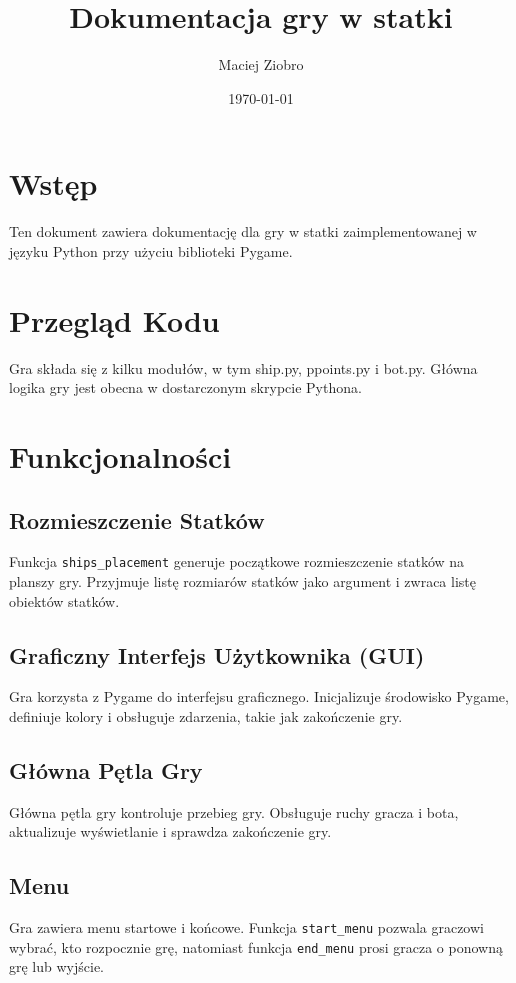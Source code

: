 \documentclass[12pt]{article}
\title{Dokumentacja gry w statki}
\author{Maciej Ziobro}
\date{\today}
\begin{document}
\maketitle
\newpage

\section{Wstęp}
Ten dokument zawiera dokumentację dla gry w statki zaimplementowanej w języku Python przy użyciu biblioteki Pygame.

\section{Przegląd Kodu}
Gra składa się z kilku modułów, w tym ship.py, ppoints.py i bot.py. Główna logika gry jest obecna w dostarczonym skrypcie Pythona.

\section{Funkcjonalności}
\subsection{Rozmieszczenie Statków}
Funkcja \texttt{ships\_placement} generuje początkowe rozmieszczenie statków na planszy gry. Przyjmuje listę rozmiarów statków jako argument i zwraca listę obiektów statków.

\subsection{Graficzny Interfejs Użytkownika (GUI)}
Gra korzysta z Pygame do interfejsu graficznego. Inicjalizuje środowisko Pygame, definiuje kolory i obsługuje zdarzenia, takie jak zakończenie gry.

\subsection{Główna Pętla Gry}
Główna pętla gry kontroluje przebieg gry. Obsługuje ruchy gracza i bota, aktualizuje wyświetlanie i sprawdza zakończenie gry.

\subsection{Menu}
Gra zawiera menu startowe i końcowe. Funkcja \texttt{start\_menu} pozwala graczowi wybrać, kto rozpocznie grę, natomiast funkcja \texttt{end\_menu} prosi gracza o ponowną grę lub wyjście.
\end{document}
